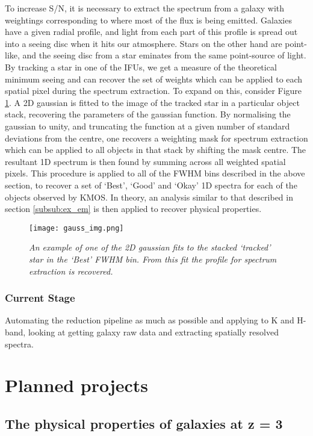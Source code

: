 \documentclass{literature}
\begin{document}
To increase S/N, it is necessary to extract the spectrum from a galaxy with weightings corresponding to where most of the flux is being emitted. Galaxies have a given radial profile, and light from each part of this profile is spread out into a seeing disc when it hits our atmosphere. Stars on the other hand are point-like, and the seeing disc from a star eminates from the same point-source of light. By tracking a star in one of the IFUs, we get a measure of the theoretical minimum seeing and can recover the set of weights which can be applied to each spatial pixel during the spectrum extraction. To expand on this, consider Figure \ref{fig:fwhm_image}. A 2D gaussian is fitted to the image of the tracked star in a particular object stack, recovering the parameters of the gaussian function. By normalising the gaussian to unity, and truncating the function at a given number of standard deviations from the centre, one recovers a weighting mask for spectrum extraction which can be applied to all objects in that stack by shifting the mask centre. The resultant 1D spectrum is then found by summing across all weighted spatial pixels. This procedure is applied to all of the FWHM bins described in the above section, to recover a set of `Best', `Good' and `Okay' 1D spectra for each of the objects observed by KMOS. In theory, an analysis similar to that described in section \ref{subsub:ex_em} is then applied to recover physical properties. 


\begin{figure}[!htp]
\centering
\texttt{[image: gauss\_img.png]}
\caption{\footnotesize{\emph{An example of one of the 2D gaussian fits to the stacked `tracked' star in the `Best' FWHM bin. From this fit the profile for spectrum extraction is recovered.}}}
\label{fig:fwhm_image}
\end{figure}	


\subsubsection{Current Stage}
Automating the reduction pipeline as much as possible and applying to K and H-band, looking at getting galaxy raw data and extracting spatially resolved spectra.




\section{Planned projects}\label{sec:projects}
\subsection{The physical properties of galaxies at z = 3}
\end{document}
